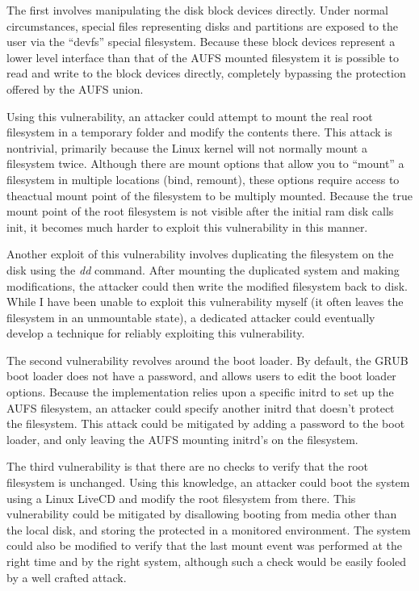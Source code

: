 \documentclass[12pt]{article}
\begin{document}
The first involves manipulating the disk block devices directly. 
Under normal circumstances, special files representing disks and partitions
are exposed to the user via the ``devfs'' special filesystem.  Because these 
block devices represent a lower level interface than that of the AUFS mounted
filesystem it is possible to read and write to the block devices directly, 
completely bypassing the protection offered by the AUFS union.

Using this vulnerability, an attacker could attempt to mount the real root
filesystem in a temporary folder and modify the contents there.  This attack 
is nontrivial, primarily because the Linux kernel will not normally mount
a filesystem twice.  Although there are mount options that allow you to 
``mount'' a filesystem in multiple locations (bind, remount), 
these options require access to theactual mount point of the filesystem to 
be multiply mounted. Because the true mount point of the root filesystem is
not visible after the initial ram disk calls init, it becomes much harder to
exploit this vulnerability in this manner.

Another exploit of this vulnerability involves duplicating the filesystem on 
the disk using the \emph{dd} command.  After mounting the duplicated system
and making modifications, the attacker could then write the modified 
filesystem back to disk.  While I have been unable to exploit this 
vulnerability myself (it often leaves the filesystem in an unmountable state),
a dedicated attacker could eventually develop a technique for reliably 
exploiting this vulnerability.

The second vulnerability revolves around the boot loader.  By default, the 
GRUB boot loader does not have a password, and allows users to edit the boot
loader options.  Because the implementation relies upon a specific initrd
to set up the AUFS filesystem, an attacker could specify another initrd 
that doesn't protect the filesystem.  This attack could be mitigated by 
adding a password to the boot loader, and only leaving the AUFS mounting 
initrd's on the filesystem.

The third vulnerability is that there are no checks to verify that the root
filesystem is unchanged.  Using this knowledge, an attacker could boot the 
system using a Linux LiveCD and modify the root filesystem from there.  
This vulnerability could be mitigated by disallowing booting from media other 
than the local disk, and storing the protected in a monitored environment. 
The system could also be modified to verify that the last mount event 
was performed at the right time and by the right system, although such a check
would be easily fooled by a well crafted attack.  
\end{document}
